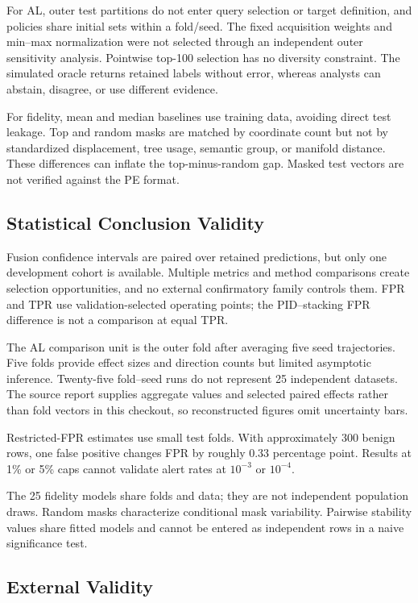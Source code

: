 For AL, outer test partitions do not enter query selection or target definition,
and policies share initial sets within a fold/seed. The fixed acquisition weights
and min--max normalization were not selected through an independent outer
sensitivity analysis. Pointwise top-100 selection has no diversity constraint.
The simulated oracle returns retained labels without error, whereas analysts can
abstain, disagree, or use different evidence.

For fidelity, mean and median baselines use training data, avoiding direct test
leakage. Top and random masks are matched by coordinate count but not by
standardized displacement, tree usage, semantic group, or manifold distance.
These differences can inflate the top-minus-random gap. Masked test vectors are
not verified against the PE format.

\subsection{Statistical Conclusion Validity}

Fusion confidence intervals are paired over retained predictions, but only one
development cohort is available. Multiple metrics and method comparisons create
selection opportunities, and no external confirmatory family controls them. FPR
and TPR use validation-selected operating points; the PID--stacking FPR
difference is not a comparison at equal TPR.

The AL comparison unit is the outer fold after averaging five seed trajectories.
Five folds provide effect sizes and direction counts but limited asymptotic
inference. Twenty-five fold--seed runs do not represent 25 independent datasets.
The source report supplies aggregate values and selected paired effects rather
than fold vectors in this checkout, so reconstructed figures omit uncertainty
bars.

Restricted-FPR estimates use small test folds. With approximately 300 benign
rows, one false positive changes FPR by roughly 0.33 percentage point. Results at
1\% or 5\% caps cannot validate alert rates at $10^{-3}$ or $10^{-4}$.

The 25 fidelity models share folds and data; they are not independent population
draws. Random masks characterize conditional mask variability. Pairwise
stability values share fitted models and cannot be entered as independent rows
in a naive significance test.

\subsection{External Validity}

